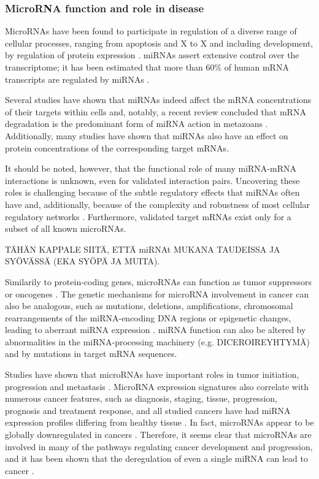 \subsubsection{MicroRNA function and role in disease}\label{microrna-function-and-role-in-disease}

MicroRNAs have been found to participate in regulation of a diverse range of
cellular processes, ranging from apoptosis and X to X and including
development, by regulation of protein expression \citep{Bushati2007}. miRNAs
assert extensive control over the transcriptome; it has been estimated that
more than 60\% of human mRNA transcripts are regulated by miRNAs
\citep{Friedman2009}.

Several studies have shown that miRNAs indeed affect the mRNA concentrations
of their targets within cells and, notably, a recent review concluded that mRNA
degradation is the predominant form of miRNA action in metazoans
\citep{Guo2010}. Additionally, many studies have shown that miRNAs also have an
effect on protein concentrations of the corresponding target mRNAs. \citep{AARGHMIKÄTÄÄVIITEON}

It should be noted, however, that the functional role of many miRNA-mRNA
interactions is unknown, even for validated interaction pairs. Uncovering
these roles is challenging because of the subtle regulatory effects that
miRNAs often have and, additionally, because of the complexity and robustness
of most cellular regulatory networks \citep{Bartel2009}. Furthermore,
validated target mRNAs exist only for a subset of all known microRNAs.

TÄHÄN KAPPALE SIITÄ, ETTÄ miRNAt MUKANA TAUDEISSA JA SYÖVÄSSÄ (EKA SYÖPÄ
JA MUITA).

Similarily to protein-coding genes, microRNAs can function as tumor
suppressors or oncogenes \citep{Lin2015}. The genetic mechanisms for microRNA
involvement in cancer can also be analogous, such as mutations, deletions,
amplifications, chromosomal rearrangements of the miRNA-encoding DNA regions
or epigenetic changes, leading to aberrant miRNA expression \citep{Calin2006}.
miRNA function can also be altered by abnormalities in the miRNA-processing
machinery (e.g. DICEROIREYHTYMÄ) and by mutations in target mRNA sequences.

Studies have shown that microRNAs have important roles in tumor initiation,
progression and metastasis \citep{Lin2015}. MicroRNA expression signatures
also correlate with numerous cancer features, such as diagnosis, staging,
tissue, progression, prognosis and treatment response, and all studied cancers
have had miRNA expression profiles differing from healthy tissue
\citep{Calin2006}. In fact, microRNAs appear to be globally downregulated in
cancers \citep{Lu2005}. Therefore, it seems clear that microRNAs are involved
in many of the pathways regulating cancer development and progression, and it
has been shown that the deregulation of even a single miRNA can lead to cancer
\citep{Costinean2006}.

